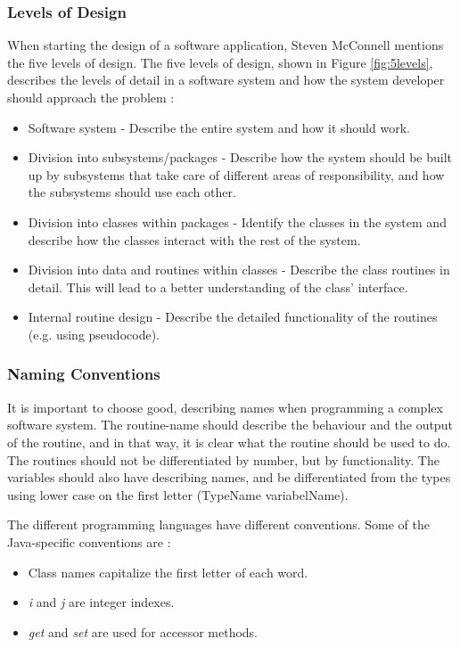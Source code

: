 \subsubsection{Levels of Design}
\label{sec:levdes}
When starting the design of a software application, Steven McConnell mentions the five levels of design. The five levels of design, shown in Figure \ref{fig:5levels}, describes the levels of detail in a software system and how the system developer should approach the problem \cite{stevemcconnell2004}:
\begin{itemize}
    \item Software system - Describe the entire system and how it should work.
    \item Division into subsystems/packages - Describe how the system should be built up by subsystems that take care of different areas of responsibility, and how the subsystems should use each other.
    \item Division into classes within packages - Identify the classes in the system and describe how the classes interact with the rest of the system.
    \item Division into data and routines within classes - Describe the class routines in detail. This will lead to a better understanding of the class' interface.
    \item Internal routine design - Describe the detailed functionality of the routines (e.g. using pseudocode).
\end{itemize}

\subsubsection{Naming Conventions}
\label{sec:nameconv}
It is important to choose good, describing names when programming a complex software system. The routine-name should describe the behaviour and the output of the routine, and in that way, it is clear what the routine should be used to do. The routines should not be differentiated by number, but by functionality. The variables should also have describing names, and be differentiated from the types using lower case on the first letter (TypeName variabelName).

The different programming languages have different conventions. Some of the Java-specific conventions are \cite{stevemcconnell2004}:
\begin{itemize}
    \item Class names capitalize the first letter of each word.
    \item \textit{i} and \textit{j} are integer indexes.
    \item \textit{get} and \textit{set} are used for accessor methods.
\end{itemize}

